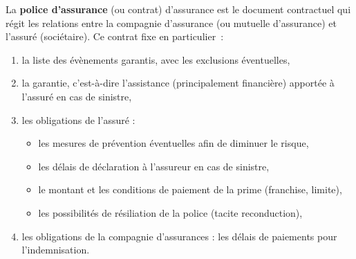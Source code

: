 \begin{f}
	
	La \textbf{police d'assurance} (ou contrat) d'assurance est le document contractuel qui régit les relations entre la compagnie d'assurance (ou mutuelle d'assurance) et l'assuré (sociétaire). 
	Ce contrat fixe en particulier~:
	
	\begin{enumerate}
		\item  la liste des évènements garantis, avec les exclusions éventuelles,
		\item  la garantie, c'est-à-dire l'assistance (principalement financière) apportée à l'assuré en cas de sinistre,
		\item  les obligations de l'assuré :
		\begin{itemize}
			\item les mesures de prévention éventuelles afin de diminuer le risque,
			\item les délais de déclaration à l'assureur en cas de sinistre,
			\item le montant et les conditions de paiement de la prime (franchise, limite),
			\item les possibilités de résiliation de la police (tacite reconduction),
		\end{itemize}
		\item  les obligations de la compagnie d'assurances : les délais de paiements pour l'indemnisation.
		
	\end{enumerate}
	
\end{f}
